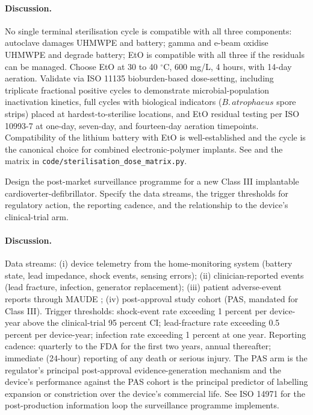 \paragraph{Discussion.}
No single terminal sterilisation cycle is compatible with all
three components: autoclave damages UHMWPE and battery; gamma and
e-beam oxidise UHMWPE and degrade battery; EtO is compatible with
all three if the residuals can be managed. Choose EtO at 30 to 40
$^{\circ}$C, 600 mg/L, 4 hours, with 14-day aeration. Validate via
ISO 11135 bioburden-based dose-setting, including triplicate
fractional positive cycles to demonstrate microbial-population
inactivation kinetics, full cycles with biological indicators
($B.\,atrophaeus$ spore strips) placed at hardest-to-sterilise
locations, and EtO residual testing per ISO 10993-7 at one-day,
seven-day, and fourteen-day aeration timepoints. Compatibility of
the lithium battery with EtO is well-established and the cycle is
the canonical choice for combined electronic-polymer implants.
See \cite{std:v6c12-iso-11135-2014} and the matrix in
\texttt{code/sterilisation\_dose\_matrix.py}.

\begin{exercise}
Design the post-market surveillance programme for a new Class III
implantable cardioverter-defibrillator. Specify the data streams,
the trigger thresholds for regulatory action, the reporting
cadence, and the relationship to the device's clinical-trial
arm.
\end{exercise}

\paragraph{Discussion.}
Data streams: (i) device telemetry from the home-monitoring system
(battery state, lead impedance, shock events, sensing errors);
(ii) clinician-reported events (lead fracture, infection,
generator replacement); (iii) patient adverse-event reports
through MAUDE \cite{web:v6c12-fda-maude-2024}; (iv) post-approval
study cohort (PAS, mandated for Class III). Trigger thresholds:
shock-event rate exceeding 1 percent per device-year above the
clinical-trial 95 percent CI; lead-fracture rate exceeding 0.5
percent per device-year; infection rate exceeding 1 percent at one
year. Reporting cadence: quarterly to the FDA for the first two
years, annual thereafter; immediate (24-hour) reporting of any
death or serious injury. The PAS arm is the regulator's principal
post-approval evidence-generation mechanism and the device's
performance against the PAS cohort is the principal predictor of
labelling expansion or constriction over the device's commercial
life. See ISO 14971 \cite{std:v6c12-iso-14971-2019} for the
post-production information loop the surveillance programme
implements.


